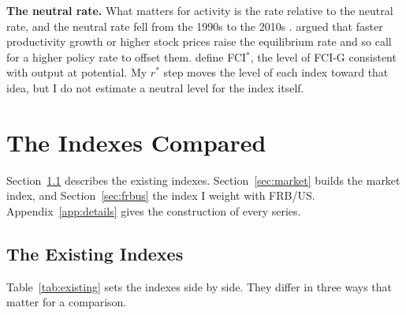 \documentclass[11pt]{article}
\newcommand{\rs}{r^{*}}
\begin{document}
\textbf{The neutral rate.} What matters for activity is the rate relative to the neutral rate, and the neutral rate fell from the 1990s to the 2010s \citep{laubach2003,holston2017,holston2023,hamilton2016,bauer2020,kiley2020}. \citet{dudley2010} argued that faster productivity growth or higher stock prices raise the equilibrium rate and so call for a higher policy rate to offset them. \citet{caballero2026} define FCI$^*$, the level of FCI-G consistent with output at potential. My $\rs$ step moves the level of each index toward that idea, but I do not estimate a neutral level for the index itself.
\FloatBarrier

\section{The Indexes Compared}\label{sec:indexes}
Section~\ref{sec:existing} describes the existing indexes. Section~\ref{sec:market} builds the market index, and Section~\ref{sec:frbus} the index I weight with FRB/US. Appendix~\ref{app:details} gives the construction of every series.

\subsection{The Existing Indexes}\label{sec:existing}
Table~\ref{tab:existing} sets the indexes side by side. They differ in three ways that matter for a comparison.
\end{document}
